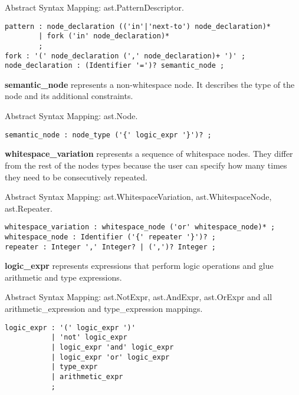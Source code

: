 \documentclass[parskip=full]{uvamscse}
\begin{document}
\begin{description}
Abstract Syntax Mapping: ast.PatternDescriptor.

\begin{snippet}
\begin{verbatim}
pattern : node_declaration (('in'|'next-to') node_declaration)*
        | fork ('in' node_declaration)*
        ;
fork : '(' node_declaration (',' node_declaration)+ ')' ;
node_declaration : (Identifier '=')? semantic_node ;
\end{verbatim}
\end{snippet}

\item\textbf{semantic\_node} represents a non-whitespace node. It describes the type of the node and its additional constraints. 

Abstract Syntax Mapping: ast.Node.

\begin{snippet}
\begin{verbatim}
semantic_node : node_type ('{' logic_expr '}')? ;
\end{verbatim}
\end{snippet}

\item\textbf{whitespace\_variation} represents a sequence of whitespace nodes. They differ from the rest of the nodes types because the user can specify how many times they need to be consecutively repeated. 

Abstract Syntax Mapping: ast.WhitespaceVariation, ast.WhitespaceNode, ast.Repeater.

\begin{snippet}
\begin{verbatim}
whitespace_variation : whitespace_node ('or' whitespace_node)* ;
whitespace_node : Identifier ('{' repeater '}')? ;
repeater : Integer ',' Integer? | (',')? Integer ;
\end{verbatim}
\end{snippet}

\item\textbf{logic\_expr} represents expressions that perform logic operations and glue arithmetic and type expressions. 

Abstract Syntax Mapping: ast.NotExpr, ast.AndExpr, ast.OrExpr and all arithmetic\_expression and type\_expression mappings.

\begin{snippet}
\begin{verbatim}
logic_expr : '(' logic_expr ')'
           | 'not' logic_expr
           | logic_expr 'and' logic_expr
           | logic_expr 'or' logic_expr
           | type_expr
           | arithmetic_expr
           ;
\end{verbatim}
\end{snippet}


\end{description}
\end{document}
